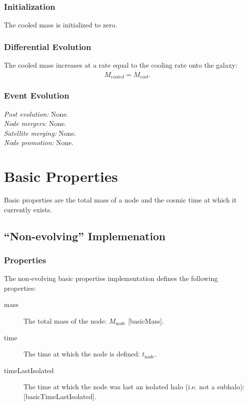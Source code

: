 \subsubsection{Initialization}

The cooled mass is initialized to zero.

\subsubsection{Differential Evolution}

The cooled mass increases at a rate equal to the cooling rate onto the galaxy:
\begin{equation}
  \dot{M_{\mathrm cooled}} = \dot{M}_{\mathrm cool}.
\end{equation}

\subsubsection{Event Evolution}

\noindent\emph{Post evolution:} None.\\

\noindent\emph{Node mergers:} None.\\

\noindent\emph{Satellite merging:} None.\\

\noindent\emph{Node promotion:} None.\\

\section{Basic Properties}\label{sec:ComponentBasicProperties}

Basic properties are the total mass of a \gls{node} and the cosmic time at which it currently exists.

\subsection{``Non-evolving'' Implemenation}

\subsubsection{Properties}

The non-evolving basic properties implementation defines the following properties:
\begin{description}
 \item [{\normalfont \ttfamily mass}] The total mass of the node: $M_{\mathrm node}$ [{\normalfont \ttfamily basicMass}].
 \item [{\normalfont \ttfamily time}] The time at which the \gls{node} is defined: $t_{\mathrm node}$.
 \item [{\normalfont \ttfamily timeLastIsolated}] The time at which the \gls{node} was last an isolated halo (i.e. not a subhalo): [\normalfont \ttfamily basicTimeLastIsolated].
\end{description}

